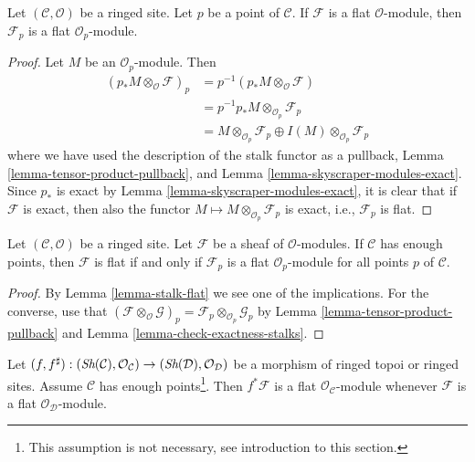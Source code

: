 \begin{lemma}
\label{lemma-stalk-flat}
Let $(\mathcal{C}, \mathcal{O})$ be a ringed site.
Let $p$ be a point of $\mathcal{C}$.
If $\mathcal{F}$ is a flat $\mathcal{O}$-module, then
$\mathcal{F}_p$ is a flat $\mathcal{O}_p$-module.
\end{lemma}

\begin{proof}
Let $M$ be an $\mathcal{O}_p$-module. Then
\begin{align*}
(p_*M \otimes_\mathcal{O} \mathcal{F})_p & =
p^{-1}(p_*M \otimes_\mathcal{O} \mathcal{F}) \\
& = p^{-1}p_*M \otimes_{\mathcal{O}_p} \mathcal{F}_p \\
& = M \otimes_{\mathcal{O}_p} \mathcal{F}_p \oplus
I(M) \otimes_{\mathcal{O}_p} \mathcal{F}_p
\end{align*}
where we have used the description of the stalk functor as a pullback,
Lemma \ref{lemma-tensor-product-pullback}, and
Lemma \ref{lemma-skyscraper-modules-exact}.
Since $p_*$ is exact by
Lemma \ref{lemma-skyscraper-modules-exact},
it is clear that if $\mathcal{F}$ is exact, then
also the functor $M \mapsto M \otimes_{\mathcal{O}_p} \mathcal{F}_p$
is exact, i.e., $\mathcal{F}_p$ is flat.
\end{proof}

\begin{lemma}
\label{lemma-check-flat-stalks}
Let $(\mathcal{C}, \mathcal{O})$ be a ringed site.
Let $\mathcal{F}$ be a sheaf of $\mathcal{O}$-modules.
If $\mathcal{C}$ has enough points, then
$\mathcal{F}$ is flat if and only if $\mathcal{F}_p$ is
a flat $\mathcal{O}_p$-module for all points $p$ of $\mathcal{C}$.
\end{lemma}

\begin{proof}
By
Lemma \ref{lemma-stalk-flat}
we see one of the implications.
For the converse, use that
$(\mathcal{F} \otimes_\mathcal{O} \mathcal{G})_p =
\mathcal{F}_p \otimes_{\mathcal{O}_p} \mathcal{G}_p$
by
Lemma \ref{lemma-tensor-product-pullback}
and
Lemma \ref{lemma-check-exactness-stalks}.
\end{proof}

\begin{lemma}
\label{lemma-pullback-flat}
Let
$(f, f^\sharp) :
(\mathop{\textit{Sh}}\nolimits(\mathcal{C}), \mathcal{O}_\mathcal{C})
\to
(\mathop{\textit{Sh}}\nolimits(\mathcal{D}), \mathcal{O}_\mathcal{D})$
be a morphism of ringed topoi or ringed sites.
Assume $\mathcal{C}$ has enough points\footnote{This assumption is
not necessary, see introduction to this section.}.
Then $f^*\mathcal{F}$ is a flat $\mathcal{O}_\mathcal{C}$-module
whenever $\mathcal{F}$ is a flat $\mathcal{O}_\mathcal{D}$-module.
\end{lemma}

